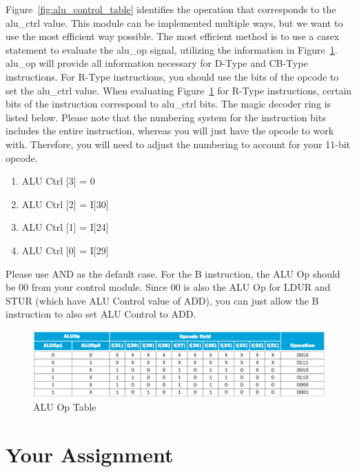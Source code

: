 Figure~\ref{fig:alu_control_table} identifies the operation that corresponds to the alu\_ctrl value.  This module can be implemented multiple ways, but we want to use the most efficient way possible.  The most efficient method is to use a casex statement to evaluate the alu\_op signal, utilizing the information in Figure~\ref{fig:alu_op_opcode_table}.  alu\_op will provide all information necessary for D-Type and CB-Type instructions.  For R-Type instructions, you should use the bits of the opcode to set the alu\_ctrl value.  When evaluating Figure~\ref{fig:alu_op_opcode_table} for R-Type instructions, certain bits of the instruction correspond to alu\_ctrl bits.  The magic decoder ring is listed below.  Please note that the numbering system for the instruction bits includes the entire instruction, whereas you will just have the opcode to work with.  Therefore, you will need to adjust the numbering to account for your 11-bit opcode.
\begin{enumerate}
	\item ALU Ctrl [3] = 0
	\item ALU Ctrl [2] = I[30]
	\item ALU Ctrl [1] = I[24]
	\item ALU Ctrl [0] = I[29]
\end{enumerate} 

Please use AND as the default case.  For the B instruction, the ALU Op should be 00 from your control module.  Since 00 is also the ALU Op for LDUR and STUR (which have ALU Control value of ADD), you can just allow the B instruction to also set ALU Control to ADD.

\begin{figure}
	\caption{ALU Op Table}\label{fig:alu_op_opcode_table}
	\begin{center}
		\includegraphics[width=4.75in]{../images/alu_op_opcode_table.png}
	\end{center}
\end{figure} 

\section{Your Assignment}

